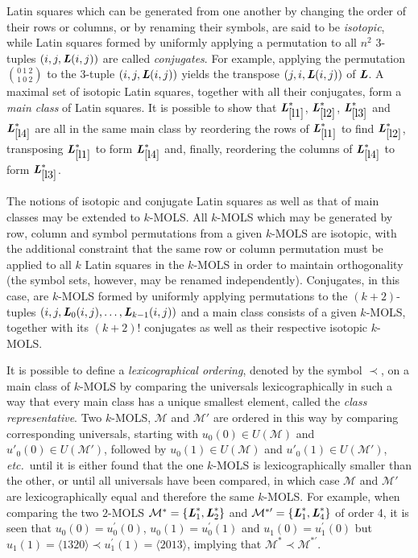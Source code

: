 \documentclass[11pt, a4paper]{article}
\newcommand{\lat}{Latin square}
\renewcommand{\l}{ \mbox{\bf \emph{L}} }
\newcommand{\m}{\mathcal{ M}}
\newcommand{\lref}[1]{$\l_{\ref{#1}}^*$}
\newcounter{ls}
\begin{document}
\lat s which can be generated from one another by changing the order of their rows or columns, or by renaming their symbols, are said to be \emph{isotopic},  while \lat s formed by uniformly applying a permutation to all $n^2$ $3$-tuples $(i,j, \l(i,j))$ are called \emph{conjugates}. For example, applying the permutation $\binom{0 \ 1 \ 2}{1\ 0\ 2}$ to the $3$-tuple $(i,j, \l(i,j))$ yields the transpose $(j,i, \l(i,j))$ of $\l$. 
A maximal  set of isotopic \lat s, together with all their conjugates, form a \emph{main class} of \lat s.  It is possible to show that \lref{l1}, \lref{l2}, \lref{l3} and \lref{l4} are all in the same main class by reordering the rows of \lref{l1} to find \lref{l2}, transposing \lref{l1} to form \lref{l4} and,  finally, reordering the columns of \lref{l4} to form \lref{l3}.

The notions of    isotopic and  conjugate \lat s as well as that of main classes may be extended to $k$-MOLS.  All $k$-MOLS which may be generated by row, column and symbol permutations from  a given $k$-MOLS are isotopic, with the additional constraint that the same row or column permutation must be applied to all $k$ \lat s in the  $k$-MOLS in order to maintain orthogonality (the symbol sets, however, may be renamed independently). Conjugates, in this case, are $k$-MOLS formed by uniformly applying permutations to the $(k+2)$-tuples $(i,j, \l_0(i,j), \ldots, \l_{k-1}(i,j))$ and a main class consists of a given $k$-MOLS, together with its $(k+2)!$ conjugates as well as their respective isotopic $k$-MOLS.

It is possible to define a \emph{lexicographical ordering}, denoted by the symbol $\prec$,  on a main class of $k$-MOLS by comparing the universals lexicographically in such a way that every main class has a unique smallest element, called the \emph{class representative}. 
Two $k$-MOLS, $\m$ and $\m'$ are ordered in this way by 
comparing corresponding universals, starting with $u_0{(0)}\in U(\m)$ and ${u'}_0{(0)}\in U(\m')$, followed 
by $u_0{(1)} \in U(\m)$ and ${u'}_0{(1)}\in U(\m')$, \emph{etc.}\ until 
it is either found that the one $k$-MOLS is lexicographically smaller than the other, or until all universals have been compared, in which case $\m$ and $\m'$ are lexicographically equal and therefore the same $k$-MOLS. For example, when comparing the two $2$-MOLS $\m^*=\{\l_1^*, \l_2^*\}$ and $\m^{*\prime}=\{\l_1^*, \l_4^*\}$ of order 4, it is seen that $u_0{(0)} ={u}_0^{\prime}{(0)}$,  $u_0{(1)} ={u}_0^{\prime}{(1)}$ and $u_1{(0)} ={u}_1^{\prime}{(0)}$ but  $u_1{(1)} = \langle 1320\rangle \prec {u}_1^{\prime}{(1)} =\langle 2013\rangle$, implying that $\m^* \prec \m^{*\prime}$.
\end{document}
